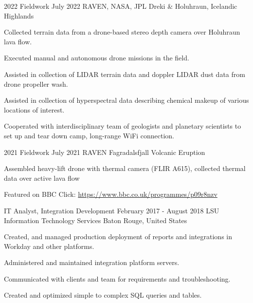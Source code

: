 

\begin{cventries}

	\cventry
	{2022 Fieldwork} %
	{July 2022} %
	{RAVEN, NASA, JPL} %
	{Dreki \& Holuhraun, Icelandic Highlands} %
	{
	\begin{cvitems}
		\item Collected terrain data from a drone-based stereo depth camera over Holuhraun lava flow.
		\item Executed manual and autonomous drone missions in the field.
		\item Assisted in collection of LIDAR terrain data and doppler LIDAR dust data from drone propeller wash.
		\item Assisted in collection of hyperspectral data describing chemical makeup of various locations of interest.
		\item Cooperated with interdisciplinary team of geologists and planetary scientists to set up and tear down camp, long-range WiFi connection.
	\end{cvitems}
	}  

	\cventry
	{2021 Fieldwork} %
	{July 2021} %
	{RAVEN} %
	{Fagradalsfjall Volcanic Eruption} %
	{
	\begin{cvitems}
		\item Assembled heavy-lift drone with thermal camera (FLIR A615), collected thermal data over active lava flow
		\item Featured on BBC Click: \url{https://www.bbc.co.uk/programmes/p09r8nzv}
	\end{cvitems}
	}  

	\cventry
	{IT Analyst, Integration Development} %
	{February 2017 - August 2018} %
	{LSU Information Technology Services} %
	{Baton Rouge, United States} %
	{
	\begin{cvitems} %
		\item {Created, and managed production deployment of reports and integrations in Workday and other platforms.}
		\item {Administered and maintained integration platform servers.}
		\item {Communicated with clients and team for requirements and troubleshooting.}
		\item {Created and optimized simple to complex SQL queries and tables.}
	\end{cvitems}
	}  


\end{cventries}
